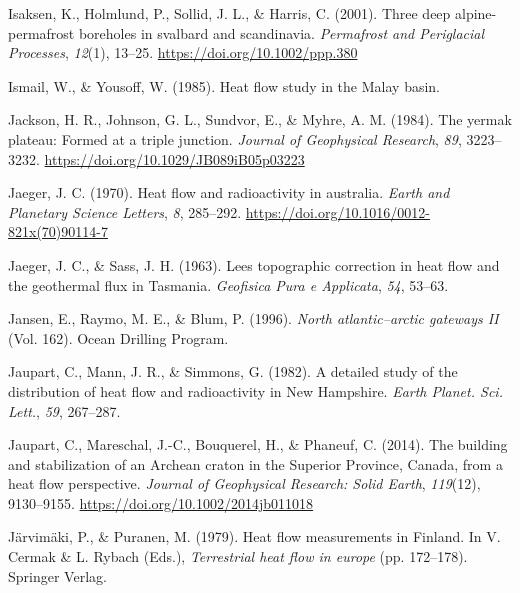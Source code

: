 \documentclass[draft,linenumbers]{agujournal2018}
\begin{document}
\leavevmode{}%
Isaksen, K., Holmlund, P., Sollid, J. L., \& Harris, C. (2001). Three
deep alpine-permafrost boreholes in svalbard and scandinavia.
\emph{Permafrost and Periglacial Processes}, \emph{12}(1), 13--25.
\url{https://doi.org/10.1002/ppp.380}

\leavevmode{}%
Ismail, W., \& Yousoff, W. (1985). Heat flow study in the {Malay basin}.

\leavevmode{}%
Jackson, H. R., Johnson, G. L., Sundvor, E., \& Myhre, A. M. (1984). The
yermak plateau: Formed at a triple junction. \emph{Journal of
Geophysical Research}, \emph{89}, 3223--3232.
\url{https://doi.org/10.1029/JB089iB05p03223}

\leavevmode{}%
Jaeger, J. C. (1970). Heat flow and radioactivity in australia.
\emph{Earth and Planetary Science Letters}, \emph{8}, 285--292.
\url{https://doi.org/10.1016/0012-821x(70)90114-7}

\leavevmode{}%
Jaeger, J. C., \& Sass, J. H. (1963). Lees topographic correction in
heat flow and the geothermal flux in {Tasmania}. \emph{Geofisica Pura e
Applicata}, \emph{54}, 53--63.

\leavevmode{}%
Jansen, E., Raymo, M. E., \& Blum, P. (1996). \emph{North
atlantic--arctic gateways II} (Vol. 162). Ocean Drilling Program.

\leavevmode{}%
Jaupart, C., Mann, J. R., \& Simmons, G. (1982). A detailed study of the
distribution of heat flow and radioactivity in {New Hampshire}.
\emph{Earth Planet. Sci. Lett.}, \emph{59}, 267--287.

\leavevmode{}%
Jaupart, C., Mareschal, J.-C., Bouquerel, H., \& Phaneuf, C. (2014). The
building and stabilization of an {Archean} craton in the {Superior
Province, Canada}, from a heat flow perspective. \emph{Journal of
Geophysical Research: Solid Earth}, \emph{119}(12), 9130--9155.
\url{https://doi.org/10.1002/2014jb011018}

\leavevmode{}%
Järvimäki, P., \& Puranen, M. (1979). Heat flow measurements in
{Finland}. In V. Cermak \& L. Rybach (Eds.), \emph{Terrestrial heat flow
in europe} (pp. 172--178). Springer Verlag.
\end{document}
